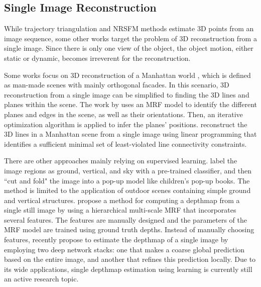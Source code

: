\subsection{Single Image Reconstruction}
While trajectory triangulation and NRSFM methods estimate 3D points from an image sequence, some other works target the problem of 3D reconstruction from a single image. Since there is only one view of the object, the object motion, either static or dynamic, becomes irreverent for the reconstruction. 

Some works focus on 3D reconstruction of a Manhattan world \cite{Coughlan_ICCV99}, which is defined as
man-made scenes with mainly orthogonal facades. In this scenario, 3D reconstruction from a single image can be simplified to finding the 3D lines and planes within the scene. The work by \citet{Delage_ISRR2005} uses an MRF model to identify the different planes and edges in the scene, as well as their orientations. Then, an iterative optimization algorithm is applied to infer the planes' positions. \citet{Ram_ICCV2013} reconstruct the 3D lines in a Manhattan scene from a single image using linear programming that identifies a sufficient minimal set of least-violated line connectivity constraints.

There are other approaches mainly relying on supervised learning. \citet{Hoiem_CGRAPH2005} label the image regions as ground, vertical, and sky with a pre-trained classifier, and then ``cut and fold" the image into a pop-up model like children's pop-up books. The method is limited to the application of outdoor scenes containing simple ground and vertical structures. \citet{Saxena_IJCV2008} propose a method for computing a depthmap from a single still image by using a hierarchical multi-scale MRF that incorporates several features. The features are manually designed and the parameters of the MRF model are trained using ground truth depths. Instead of manually choosing features, \citet{eigen2014depth} recently propose to estimate the depthmap of a single image by employing two deep network stacks: one that makes a coarse global prediction based on the entire image, and another that refines this prediction locally. Due to its wide applications, single depthmap estimation using learning is currently still an active research topic.



















